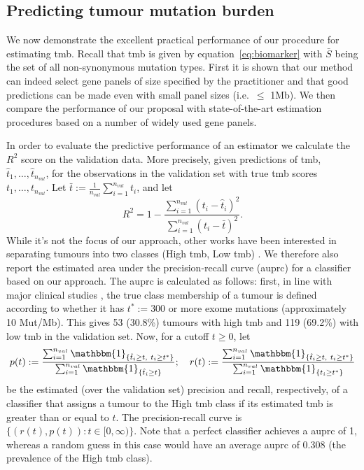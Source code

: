 \documentclass[12pt]{article}
\begin{document}
\subsection{Predicting tumour mutation burden \label{sec:tmb}}
We now demonstrate the excellent practical performance of our procedure for estimating \acrshort{tmb}. Recall that \acrshort{tmb} is given by equation~\eqref{eq:biomarker} with $\bar{S}$ being the set of all non-synonymous mutation types. First it is shown that our method can indeed select gene panels of size specified by the practitioner and that good predictions can be made even with small panel sizes (i.e.~$\leq$ 1Mb). We then compare the performance of our proposal with state-of-the-art estimation procedures based on a number of widely used gene panels.

In order to evaluate the predictive performance of an estimator we calculate the $R^2$ score on the validation data. More precisely, given predictions of \acrshort{tmb}, $\hat{t}_1, \ldots, \hat{t}_{n_{val}}$, for the observations in the validation set with true \acrshort{tmb} scores $t_1, \ldots, t_{n_{val}}$. Let $\bar{t} := \frac{1}{n_{val}} \sum_{i=1}^{n_{val}} t_i$, and let 
    \[
    R^2 = 1- \frac{\sum_{i =1}^{n_{val}}(t_i - \hat{t}_i)^2}{\sum_{i = 1}^{n_{val}}(t_i - \bar{t})^2}. 
    \]
 While it's not the focus of our approach, other works have been interested in separating tumours into two classes (High \acrshort{tmb}, Low \acrshort{tmb}) \citep{buttner_implementing_2019, wu_designing_2019}. We therefore also report the estimated area under the precision-recall curve (\acrshort{auprc}) for a classifier based on our approach. The \acrshort{auprc} is calculated as follows: first, in line with major clinical studies \citep[see, for example,][]{hellmann_nivolumab_2018, ramalingam_abstract_2018}, the true class membership of a tumour is defined according to whether it has $t^* := 300$ or more exome mutations (approximately 10 Mut/Mb). This gives 53 (30.8\%) tumours with high \acrshort{tmb} and 119 (69.2\%) with low \acrshort{tmb} in the validation set. Now, for a cutoff $t \geq 0$, let 
 \[
 p(t) := \frac{\sum_{i=1}^{n_{val}} \mathbbm{1}_{\{\hat{t}_i \geq t, \ t_i \geq t^*\}}}{\sum_{i=1}^{n_{val}} \mathbbm{1}_{\{\hat{t}_i \geq t\}}}; \quad  r(t) := \frac{\sum_{i=1}^{n_{val}} \mathbbm{1}_{\{\hat{t}_i \geq t, \ t_i \geq t^*\}}}{\sum_{i=1}^{n_{val}} \mathbbm{1}_{\{t_i \geq t^*\}}}
 \]
 be the estimated (over the validation set) precision and recall, respectively, of a classifier that assigns a tumour to the High \acrshort{tmb} class if its estimated \acrshort{tmb} is greater than or equal to $t$.  The precision-recall curve is $\{(r(t),p(t)): t \in [0, \infty)\}$. Note that a perfect classifier achieves a \acrshort{auprc} of 1, whereas a random guess in this case would have an average \acrshort{auprc} of 0.308 (the prevalence of the High \acrshort{tmb} class).
\end{document}

